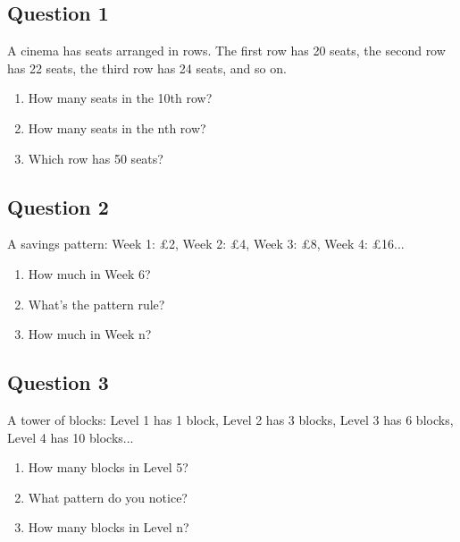 \documentclass{article}
\begin{document}
\subsection*{Question 1}
A cinema has seats arranged in rows. The first row has 20 seats, the second row has 22 seats, the third row has 24 seats, and so on.
\begin{enumerate}
    \item How many seats in the 10th row? \underline{\hspace{3cm}}
    \item How many seats in the nth row? \underline{\hspace{3cm}}
    \item Which row has 50 seats? \underline{\hspace{3cm}}
\end{enumerate}

\subsection*{Question 2}
A savings pattern: Week 1: £2, Week 2: £4, Week 3: £8, Week 4: £16...
\begin{enumerate}
    \item How much in Week 6? \underline{\hspace{3cm}}
    \item What's the pattern rule? \underline{\hspace{5cm}}
    \item How much in Week n? \underline{\hspace{3cm}}
\end{enumerate}

\subsection*{Question 3}
A tower of blocks: Level 1 has 1 block, Level 2 has 3 blocks, Level 3 has 6 blocks, Level 4 has 10 blocks...
\begin{enumerate}
    \item How many blocks in Level 5? \underline{\hspace{2cm}}
    \item What pattern do you notice? \underline{\hspace{5cm}}
    \item How many blocks in Level n? \underline{\hspace{4cm}}
\end{enumerate}
\end{document}
